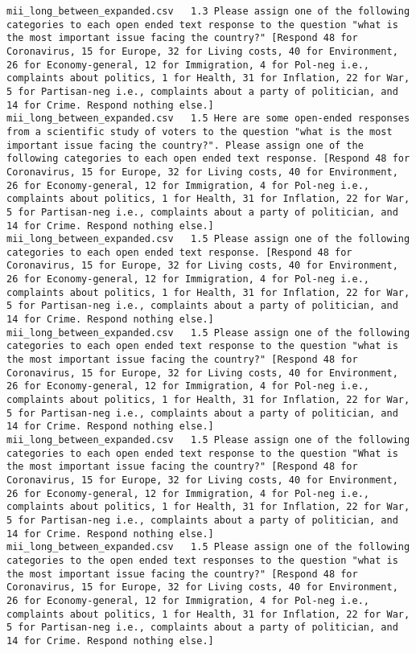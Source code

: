 \begin{lstlisting}[label=lst:promptvariants]
mii_long_between_expanded.csv	1.3	Please assign one of the following categories to each open ended text response to the question "what is the most important issue facing the country?" [Respond 48 for Coronavirus, 15 for Europe, 32 for Living costs, 40 for Environment, 26 for Economy-general, 12 for Immigration, 4 for Pol-neg i.e., complaints about politics, 1 for Health, 31 for Inflation, 22 for War, 5 for Partisan-neg i.e., complaints about a party of politician, and 14 for Crime. Respond nothing else.]
mii_long_between_expanded.csv	1.5	Here are some open-ended responses from a scientific study of voters to the question "what is the most important issue facing the country?". Please assign one of the following categories to each open ended text response. [Respond 48 for Coronavirus, 15 for Europe, 32 for Living costs, 40 for Environment, 26 for Economy-general, 12 for Immigration, 4 for Pol-neg i.e., complaints about politics, 1 for Health, 31 for Inflation, 22 for War, 5 for Partisan-neg i.e., complaints about a party of politician, and 14 for Crime. Respond nothing else.]
mii_long_between_expanded.csv	1.5	Please assign one of the following categories to each open ended text response. [Respond 48 for Coronavirus, 15 for Europe, 32 for Living costs, 40 for Environment, 26 for Economy-general, 12 for Immigration, 4 for Pol-neg i.e., complaints about politics, 1 for Health, 31 for Inflation, 22 for War, 5 for Partisan-neg i.e., complaints about a party of politician, and 14 for Crime. Respond nothing else.]
mii_long_between_expanded.csv	1.5	Please assign one of the following categories to each open ended text response to the question "what is the most important issue facing the country?" [Respond 48 for Coronavirus, 15 for Europe, 32 for Living costs, 40 for Environment, 26 for Economy-general, 12 for Immigration, 4 for Pol-neg i.e., complaints about politics, 1 for Health, 31 for Inflation, 22 for War, 5 for Partisan-neg i.e., complaints about a party of politician, and 14 for Crime. Respond nothing else.]
mii_long_between_expanded.csv	1.5	Please assign one of the following categories to each open ended text response to the question "What is the most important issue facing the country?" [Respond 48 for Coronavirus, 15 for Europe, 32 for Living costs, 40 for Environment, 26 for Economy-general, 12 for Immigration, 4 for Pol-neg i.e., complaints about politics, 1 for Health, 31 for Inflation, 22 for War, 5 for Partisan-neg i.e., complaints about a party of politician, and 14 for Crime. Respond nothing else.]
mii_long_between_expanded.csv	1.5	Please assign one of the following categories to the open ended text responses to the question "what is the most important issue facing the country?" [Respond 48 for Coronavirus, 15 for Europe, 32 for Living costs, 40 for Environment, 26 for Economy-general, 12 for Immigration, 4 for Pol-neg i.e., complaints about politics, 1 for Health, 31 for Inflation, 22 for War, 5 for Partisan-neg i.e., complaints about a party of politician, and 14 for Crime. Respond nothing else.]

\end{lstlisting}
